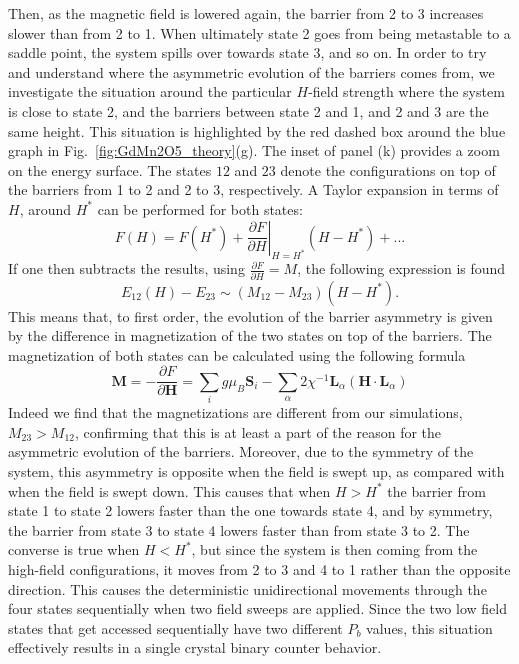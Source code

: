 Then, as the magnetic field is lowered again, the barrier from 2 to 3 increases slower than from 2 to 1. When ultimately state 2 goes from being metastable to a saddle point, the system spills over towards state 3, and so on.
In order to try and understand where the asymmetric evolution of the barriers comes from, we investigate the situation around the particular $H$-field strength where the system is close to state 2, and the barriers between state 2 and 1, and 2 and 3 are the same height.
This situation is highlighted by the red dashed box around the blue graph in Fig.~\ref{fig:GdMn2O5_theory}(g). The inset of panel (k) provides a zoom on the energy surface. The states $12$ and $23$ denote the configurations on top of the barriers from 1 to 2 and 2 to 3, respectively. A Taylor expansion in terms of $H$, around $H^*$ can be performed for both states:
\begin{equation}
	F(H) = F(H^*) + \left.\frac{\partial F}{\partial H}\right\rvert_{H=H^*} (H-H^*) + ...
\end{equation}
If one then subtracts the results, using $\frac{\partial F}{\partial H} = M$, the following expression is found
\begin{equation}
	E_{12}(H) - E_{23} \sim (M_{12} - M_{23}) (H - H^*).
\end{equation}
This means that, to first order, the evolution of the barrier asymmetry is given by the difference in magnetization of the two states on top of the barriers.
The magnetization of both states can be calculated using the following formula
\begin{equation}
	\mathbf{M} = -\frac{\partial{F}}{\partial{\mathbf{H}}} = \sum_i g \mu_{B} \mathbf{S}_i - \sum_{\alpha} 2 \chi^{-1}\mathbf{L}_{\alpha} (\mathbf{H} \cdot \mathbf{L}_{\alpha}) 
\end{equation}
Indeed we find that the magnetizations are different from our simulations, $M_{23} > M_{12}$, confirming that this is at least a part of the reason for the asymmetric evolution of the barriers.
Moreover, due to the symmetry of the system, this asymmetry is opposite when the field is swept up, as compared with when the field is swept down.
This causes that when $H > H^*$ the barrier from state 1 to state 2 lowers faster than the one towards state 4, and by symmetry, the barrier from state 3 to state 4 lowers faster than from state 3 to 2.
The converse is true when $H < H^*$, but since the system is then coming from the high-field configurations, it moves from 2 to 3 and 4 to 1 rather than the opposite direction.
This causes the deterministic unidirectional movements through the four states sequentially when two field sweeps are applied.
Since the two low field states that get accessed sequentially have two different $P_b$ values, this situation effectively results in a single crystal binary counter behavior.  

